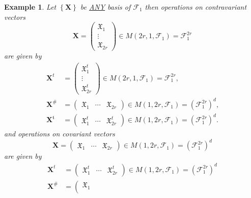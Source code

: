 \documentclass[aps, preprint]{revtex4}
\newtheorem{example}[theorem]{Example}
\begin{document}
\begin{example}
Let $\left \{\mathbf{X}\right \}$ be \underline {\emph{ANY}} basis of $\mathcal{F}_{1}$ then operations on contravariant vectors
\begin{equation}\mathbf{X} =\left (\begin{array}{c}\mathfrak{X}_{1} \\
\vdots  \\
\mathfrak{X}_{2 r}\end{array}\right ) \in M \left (2 r ,1 ,\mathcal{F}_{1}\right ) =\mathcal{F}_{1}^{2 r}
\end{equation}are given by
\begin{align}\mathbf{X}^{t} &  =\left (\begin{array}{c}\mathfrak{X}_{1}^{t} \\
\vdots  \\
\mathfrak{X}_{2 r}^{t}\end{array}\right ) \in M \left (2 r ,1 ,\mathcal{F}_{1}\right ) =\mathcal{F}_{1}^{2 r}\text{,} \\
\mathbf{X}^{\#} &  =\left (\begin{array}{ccc}\mathfrak{X}_{1} & \cdots  & \mathfrak{X}_{2 r}\end{array}\right ) \in M \left (1 ,2 r ,\mathcal{F}_{1}\right ) =\left (\mathcal{F}_{1}^{2 r}\right )^{d}\text{,} \\
\mathbf{X}^{\mathfrak{t}} &  =\left (\begin{array}{ccc}\mathfrak{X}_{1}^{t} & \cdots  & \mathfrak{X}_{2 r}^{t}\end{array}\right ) \in M \left (1 ,2 r ,\mathcal{F}_{1}\right ) =\left (\mathcal{F}_{1}^{2 r}\right )^{d}\text{.}\end{align}and operations on covariant vectors
\begin{equation}\mathbf{X} =\left (\begin{array}{ccc}\mathfrak{X}_{1} & \cdots  & \mathfrak{X}_{2 r}\end{array}\right ) \in M \left (1 ,2 r ,\mathcal{F}_{1}\right ) =\left (\mathcal{F}_{1}^{2 r}\right )^{d}
\end{equation}are given by
\begin{align}\mathbf{X}^{t} &  =\left (\begin{array}{ccc}\mathfrak{X}_{1}^{t} & \cdots  & \mathfrak{X}_{2 r}^{t}\end{array}\right ) \in M \left (1 ,2 r ,\mathcal{F}_{1}\right ) =\left (\mathcal{F}_{1}^{2 r}\right )^{d} \\
\mathbf{X}^{\#} &  =\left (\begin{array}{c}\mathfrak{X}_{1} \\

\end{array}
\end{align}
\end{example}
\end{document}

